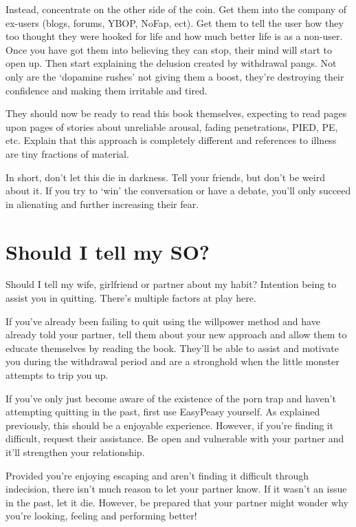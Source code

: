 \documentclass[
]{book}
\begin{document}
Instead, concentrate on the other side of the coin. Get them into the company of ex-users (blogs, forums, YBOP, NoFap, ect). Get them to tell the user how they too thought they were hooked for life and how much better life is as a non-user. Once you have got them into believing they can stop, their mind will start to open up. Then start explaining the delusion created by withdrawal pangs. Not only are the `dopamine rushes' not giving them a boost, they're destroying their confidence and making them irritable and tired.

They should now be ready to read this book themselves, expecting to read pages upon pages of stories about unreliable arousal, fading penetrations, PIED, PE, etc. Explain that this approach is completely different and references to illness are tiny fractions of material.

In short, don't let this die in darkness. Tell your friends, but don't be weird about it. If you try to `win' the conversation or have a debate, you'll only succeed in alienating and further increasing their fear.

\hypertarget{should-i-tell-my-so}{%
\section{Should I tell my SO?}\label{should-i-tell-my-so}}

Should I tell my wife, girlfriend or partner about my habit? Intention being to assist you in quitting. There's multiple factors at play here.

If you've already been failing to quit using the willpower method and have already told your partner, tell them about your new approach and allow them to educate themselves by reading the book. They'll be able to assist and motivate you during the withdrawal period and are a stronghold when the little monster attempts to trip you up.

If you've only just become aware of the existence of the porn trap and haven't attempting quitting in the past, first use EasyPeasy yourself. As explained previously, this should be a enjoyable experience. However, if you're finding it difficult, request their assistance. Be open and vulnerable with your partner and it'll strengthen your relationship.

Provided you're enjoying escaping and aren't finding it difficult through indecision, there isn't much reason to let your partner know. If it wasn't an issue in the past, let it die. However, be prepared that your partner might wonder why you're looking, feeling and performing better!
\end{document}
